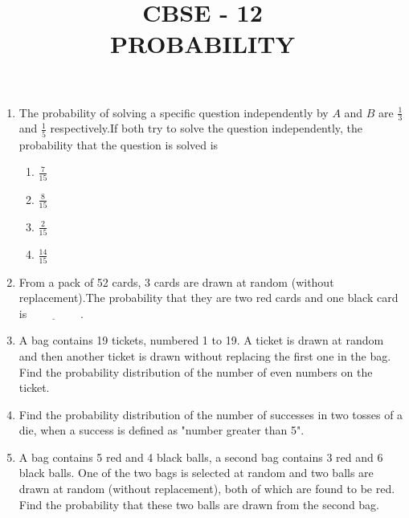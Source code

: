 \documentclass{article}
\begin{document}
\begin{center}
\title{\textbf{CBSE - 12} \\ {PROBABILITY}}

\date{}
\maketitle
\end{center}
\begin{enumerate}
    \item The probability of solving a specific question independently by $A$ and $B$ are $\frac{1}{3}$ and $\frac{1}{5}$ respectively.If both try to solve the question independently, the probability that the question is solved is
    \begin{enumerate}
        \item $\frac{7}{15}$
        \item $\frac{8}{15}$
        \item $\frac{2}{15}$
        \item $\frac{14}{15}$
    \end{enumerate}
   
    \item From a pack of 52 cards, 3 cards are drawn at random (without replacement).The probability that they are two red cards and one black card is$\underline{\hspace{2cm}}$.
    \item A bag contains 19 tickets, numbered 1 to 19. A ticket is drawn at random and then another ticket is drawn without replacing the first one in the bag. Find the probability distribution of the number of even numbers on the ticket.
   
    \item Find the probability distribution of the number of successes in two tosses of a die, when a success is defined as "number greater than 5".
    \item A bag contains 5 red and 4 black balls, a second bag contains 3 red and 6 black balls. One of the two bags is selected at random and two balls are drawn at random (without replacement), both of which are found to be red. Find the probability that these two balls are drawn from the second bag.
   

\end{enumerate}
\end{document}
